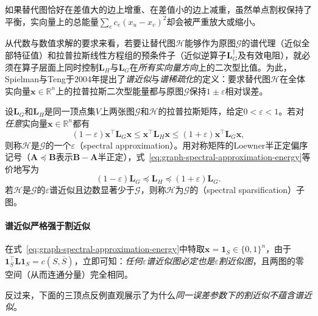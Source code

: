 如果替代图恰好在差值大的边上增重、在差值小的边上减重，虽然单点割权保持了平衡，实向量上的总能量$\sum_e c_e(x_u-x_v)^2$却会被严重放大或缩小。

从代数与数值求解的要求来看，若要让替代图$\mathcal H$能够作为原图$\mathcal G$的谱代理（近似全部特征值）和拉普拉斯线性方程组的预条件子（近似逆算子$\bm L_G^\dagger$及有效电阻），就必须在算子层面上同时控制$\bm L_H$与$\bm L_G$在\emph{所有实向量方向}上的二次型比值。为此，Spielman与Teng于2004年提出了\emph{谱近似}与\emph{谱稀疏化}的定义：要求替代图$\mathcal H$在全体实向量$\bm x\in\mathbb R^n$上的拉普拉斯二次型能量都与原图$\mathcal G$保持$1\pm\varepsilon$相对误差。

\begin{definition}[谱近似与谱稀疏化]
\label{def:graph-spectral-approximation}
设$\bm L_G$和$\bm L_H$是同一顶点集$V$上两张图$\mathcal G$和$\mathcal H$的拉普拉斯矩阵，给定$0<\varepsilon<1$。若对\emph{任意}实向量$\bm x\in\mathbb R^n$都有
\begin{equation}
(1-\varepsilon)\bm x^\top\bm L_G\bm x
\leq \bm x^\top\bm L_H\bm x
\leq (1+\varepsilon)\bm x^\top\bm L_G\bm x,
\label{eq:graph-spectral-approximation-energy}
\end{equation}
则称$\mathcal H$是$\mathcal G$的一个$\varepsilon$（spectral approximation）。用对称矩阵的Loewner半正定偏序记号（$\bm A\preceq\bm B$表示$\bm B-\bm A$半正定），式~\eqref{eq:graph-spectral-approximation-energy}等价地写为
\begin{equation}
(1-\varepsilon)\bm L_G\preceq\bm L_H\preceq(1+\varepsilon)\bm L_G.
\label{eq:graph-spectral-approximation-order}
\end{equation}
若$\mathcal H$是$\mathcal G$的$\varepsilon$谱近似且边数显著少于$\mathcal G$，则称$\mathcal H$为$\mathcal G$的（spectral sparsification）子图。
\end{definition}

\paragraph{谱近似严格强于割近似}

在式~\eqref{eq:graph-spectral-approximation-energy}中特取$\bm x=\bm 1_S\in\{0,1\}^n$，由于$\bm 1_S^\top\bm L\bm 1_S=c(S,\overline S)$，立即可知：\emph{任何$\varepsilon$谱近似图必定也是$\varepsilon$割近似图}，且两图的零空间（从而连通分量）完全相同。

反过来，下面的三顶点反例直观展示了为什么\emph{同一误差参数下的割近似不蕴含谱近似}。

